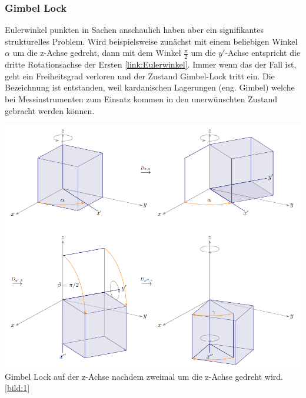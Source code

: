 \subsubsection{Gimbel Lock}
Eulerwinkel punkten in Sachen anschaulich haben aber ein signifikantes strukturelles Problem.
Wird beispielsweise zunächst mit einem beliebigen Winkel $\alpha$ um die z-Achse gedreht, dann mit dem Winkel $\frac{\pi}{2}$ um die $y'$-Achse entspricht die dritte Rotationsachse der Ersten \ref{link:Eulerwinkel}. Immer wenn das der Fall ist, geht ein Freiheitsgrad verloren und der Zustand Gimbel-Lock tritt ein. Die Bezeichnung ist entstanden, weil kardanischen Lagerungen (eng. Gimbel) welche bei Messinstrumenten zum Einsatz kommen in den unerwünschten Zustand gebracht werden können.
\begin{center}
	\includegraphics[scale=0.5]{../images/0027 Gimbel Lock.png}{\\Gimbel Lock auf der z-Achse nachdem zweimal um die z-Achse gedreht wird. \ref{bild:1}}
\end{center}


